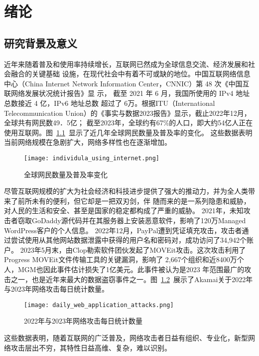 \chapter{绪论}
\label{cha:overview}

\section{研究背景及意义}

近年来随着普及和使用率持续增长，互联网已然成为全球信息交流、经济发展和社会融合的关键基础
设施，在现代社会中有着不可或缺的地位。中国互联网络信息中心（China Internet 
Network Information Center，CNNIC）第 48 次《中国互联网络发展状况统计报告》显
示\cite{cnnic2021}， 截至 2021 年 6 月，我国所使用的 IPv4 地址总数接近 4 亿，IPv6 地址总数
超过了 6万。根据ITU（International Telecommunication Union）的《事实与数据2023报告》显示\cite{itu2023}，截止2022年12月，全球共有网民数49．5亿；
截至2023年，全球约有67\%的人口，即大约54亿人正在使用互联网。图~\ref{fig:individula_using_internet}~显示了近几年全球网民数量及普及率的变化。
这些数据表明当前网络规模在急剧扩大，网络多样性也在逐渐增加。
\begin{figure}[htbp]
    \centering
    \texttt{[image: individula\_using\_internet.png]}
    \caption{全球网民数量及普及率变化\cite{fig-itu2023}}
    \label{fig:individula_using_internet}
\end{figure} 


尽管互联网规模的扩大为社会经济和科技进步提供了强大的推动力，并为全人类带来了前所未有的便利，但它却是一把双刃剑，伴
随而来的是一系列隐患和威胁，对人民的生活和安全、甚至是国家的稳定都构成了严重的威胁。
2021年，未知攻击者窃取GoDaddy源代码并在其服务器上安装恶意软件，影响了120万Managed WordPress客户的个人信息。
2022年12月，PayPal遭到凭证填充攻击，攻击者通过尝试使用从其他网站数据泄露中获得的用户名和密码对，成功访问了34,942个账户。
2023年5月末，由Clop勒索软件团伙发起了MOVEit攻击。这次攻击利用了Progress MOVEit文件传输工具的关键漏洞，影响了
2,667个组织和近8400万个人，MGM也因此事件估计损失了1亿美元​。此事件被认为是2023
年范围最广的攻击之一，也是近年来最大的数据盗窃事件之一。图~\ref{fig:daily_web_application_attacks}~展示了Akamai关于2022年
与2023年网络攻击每日统计数量。
\begin{figure}[htbp]
  \centering
  \texttt{[image: daily\_web\_application\_attacks.png]}
  \caption{2022年与2023年网络攻击每日统计数量\cite{akamai}}
  \label{fig:daily_web_application_attacks}
\end{figure}
这些数据表明，随着互联网的广泛普及，网络攻击者日益有组织、专业化，新型网络攻击层出不穷，其特性日益高维、复杂，难以识别。\par

